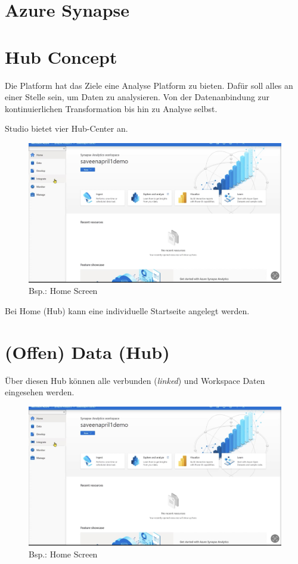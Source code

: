 \section{Azure Synapse}
\section{Hub Concept}
Die Platform \ASA hat das Ziele eine Analyse Platform zu bieten. Dafür soll alles an einer Stelle sein, um Daten zu analysieren. Von der Datenanbindung zur kontinuierlichen Transformation bis hin zu Analyse selbst.

\ASA Studio bietet vier Hub-Center an.
\begin{figure}[H]
	\centering
	\includegraphics[scale = 0.2]{attachment/chapter_2/Scc108}
	\caption{Bsp.: Home Screen}
\end{figure}
Bei Home (Hub) kann eine individuelle Startseite angelegt werden.

\section{(Offen) Data (Hub)}
Über diesen Hub können alle verbunden (\textit{linked}) und Workspace Daten eingesehen werden.

\begin{figure}[H]
	\centering
	\includegraphics[scale = 0.2]{attachment/chapter_2/Scc108}
	\caption{Bsp.: Home Screen}
\end{figure}

